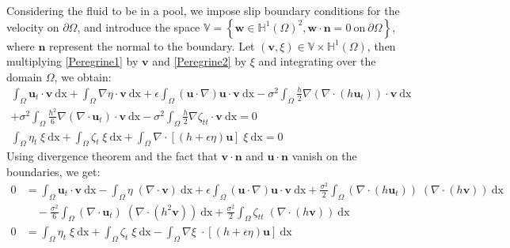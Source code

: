 \documentclass[11pt,a4paper]{article}
\begin{document}
		Considering the fluid to be in a pool, we impose slip boundary conditions for the velocity on $\partial \Omega$, and introduce the space $\mathbb{V} = \left\lbrace \mathbf{w} \in \mathbb{H}^1(\Omega)^2, \mathbf{w} \cdot \mathbf{n} = 0 \: \mathrm{on} \: \partial \Omega \right\rbrace $, where $\mathbf{n}$ represent the normal to the boundary. Let $(\mathbf{v},\xi) \in \mathbb{V} \times \mathbb{H}^1(\Omega)$, then multiplying \eqref{Peregrine1} by $\mathbf{v}$ and \eqref{Peregrine2} by $\xi$ and integrating over the domain $\Omega$, we obtain:   
		\begin{equation}
			\begin{split}
				\int_{\Omega} \! \mathbf{u}_t \cdot \mathbf{v} \: \mathrm{dx} + \int_{\Omega} \! \nabla \eta \cdot \mathbf{v} \: \mathrm{dx} + \epsilon \! \int_{\Omega} \! (\mathbf{u} \cdot \nabla ) \mathbf{u} \cdot \mathbf{v} \: \mathrm{dx} - \sigma^2 \! \int_{\Omega} \! \frac{h}{2} \nabla (\nabla \cdot (h \mathbf{u}_t)) \cdot \mathbf{v} \: \mathrm{dx} \\
				+ \sigma^2 \! \int_{\Omega} \! \frac{h^2}{6} \nabla (\nabla \cdot \mathbf{u}_t) \cdot \mathbf{v} \: \mathrm{dx} - \sigma^2 \! \int_{\Omega} \! \frac{h}{2} \nabla \zeta_{tt} \cdot \mathbf{v} \: \mathrm{dx} = 0\\
				\int_{\Omega}\! \eta_t \; \xi \: \mathrm{dx} +\int_{\Omega}\! \zeta_t \; \xi \: \mathrm{dx} +\int_{\Omega}\! \nabla \cdot [(h+\epsilon\eta) \mathbf{u}] \; \xi \: \mathrm{dx} = 0
			\end{split}
			\label{PeregrineWeakForm1}
		\end{equation}
		Using divergence theorem and the fact that $\mathbf{v} \cdot \mathbf{n}$ and $\mathbf{u} \cdot \mathbf{n}$ vanish on the boundaries, we get: 
		\begin{equation}
			\begin{split}
				0 &= \int_{\Omega} \! \mathbf{u}_t \cdot \mathbf{v} \: \mathrm{dx} - \int_{\Omega} \! \eta \; (\nabla \cdot \mathbf{v}) \: \mathrm{dx} + \epsilon \! \int_{\Omega} \! (\mathbf{u} \cdot \nabla ) \mathbf{u} \cdot \mathbf{v} \: \mathrm{dx} + \frac{\sigma^2}{2} \! \int_{\Omega} \!  (\nabla \cdot (h \mathbf{u}_t)) \; (\nabla \cdot (h \mathbf{v}) )\: \mathrm{dx} \\
				&\quad - \frac{\sigma^2}{6} \! \int_{\Omega} \! (\nabla \cdot \mathbf{u}_t) \; (\nabla  \cdot (h^2  \mathbf{v})) \: \mathrm{dx} + \frac{\sigma^2}{2} \! \int_{\Omega} \!  \zeta_{tt}  \; (\nabla \cdot( h \mathbf{v})) \: \mathrm{dx}\\
				0 &= \int_{\Omega}\! \eta_t \; \xi \: \mathrm{dx} +\int_{\Omega}\! \zeta_t \; \xi \: \mathrm{dx} -\int_{\Omega}\! \nabla \xi \; \cdot [(h+\epsilon\eta) \mathbf{u}]  \: \mathrm{dx}
			\end{split} 
		\end{equation}
\end{document}
